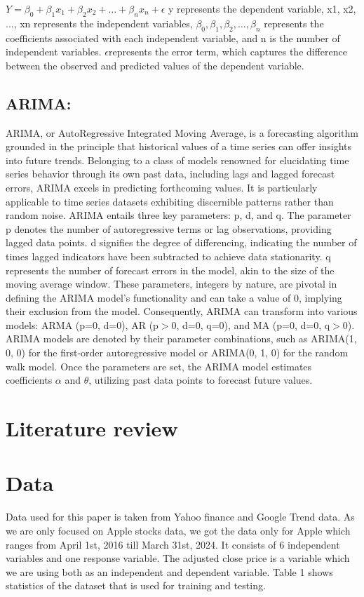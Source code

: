 \documentclass[conference,onecolumn,11pt]{IEEEtran}
\begin{document}
$Y = \beta_0+\beta_1 x_1 + \beta_2 x_2 + \ldots+\beta_n x_n + \epsilon$
y represents the dependent variable, x1, x2, ..., xn represents the independent variables, $\beta_0,\beta_1,\beta_2,\ldots,\beta_n$ represents the coefficients associated with each independent variable, and n is the number of independent variables. $\epsilon$represents the error term, which captures the difference between the observed and predicted values of the dependent variable.


\subsection*{ARIMA:}

ARIMA, or AutoRegressive Integrated Moving Average, is a forecasting algorithm grounded in the principle that historical values of a time series can offer insights into future trends. Belonging to a class of models renowned for elucidating time series behavior through its own past data, including lags and lagged forecast errors, ARIMA excels in predicting forthcoming values. It is particularly applicable to time series datasets exhibiting discernible patterns rather than random noise. ARIMA entails three key parameters: p, d, and q. The parameter p denotes the number of autoregressive terms or lag observations, providing lagged data points. d signifies the degree of differencing, indicating the number of times lagged indicators have been subtracted to achieve data stationarity. q represents the number of forecast errors in the model, akin to the size of the moving average window. These parameters, integers by nature, are pivotal in defining the ARIMA model's functionality and can take a value of 0, implying their exclusion from the model. Consequently, ARIMA can transform into various models: ARMA (p=0, d=0), AR (p$>$0, d=0, q=0), and MA (p=0, d=0, q$>$0). ARIMA models are denoted by their parameter combinations, such as ARIMA(1, 0, 0) for the first-order autoregressive model or ARIMA(0, 1, 0) for the random walk model. Once the parameters are set, the ARIMA model estimates coefficients $\alpha$ and $\theta$, utilizing past data points to forecast future values.

\section{Literature review}



\section{Data}
Data used for this paper is taken from Yahoo finance and Google Trend data. As we are only focused on Apple stocks data, we got the data only for Apple which ranges from April 1st, 2016 till March 31st, 2024. It consists of 6 independent variables and one response variable. The adjusted close price is a variable which we are using both as an independent and dependent variable. Table 1 shows statistics of the dataset that is used for training and testing.
\end{document}
